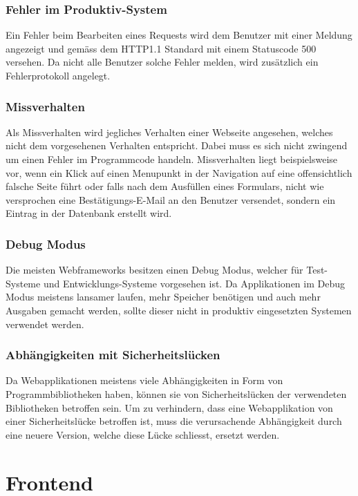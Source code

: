 \subsubsection{Fehler im Produktiv-System}
\label{ssub:fehlerimproduktivsystem}
Ein Fehler beim Bearbeiten eines Requests wird dem Benutzer mit einer Meldung angezeigt und gemäss dem HTTP1.1\cite{rfc2616} Standard mit einem Statuscode 500 versehen. Da nicht alle Benutzer solche Fehler melden, wird zusätzlich ein Fehlerprotokoll angelegt.

\subsubsection{Missverhalten}
\label{ssub:missverhalten}
Als Missverhalten wird jegliches Verhalten einer Webseite angesehen, welches nicht dem vorgesehenen Verhalten entspricht. Dabei muss es sich nicht zwingend um einen Fehler im Programmcode handeln. Missverhalten liegt beispielsweise vor, wenn ein Klick auf einen Menupunkt in der Navigation auf eine offensichtlich falsche Seite führt oder falls nach dem Ausfüllen eines Formulars, nicht wie versprochen eine Bestätigungs-E-Mail an den Benutzer versendet, sondern ein Eintrag in der Datenbank erstellt wird.

\subsubsection{Debug Modus}
\label{ssub:debugmodus}
Die meisten Webframeworks besitzen einen Debug Modus, welcher für Test-Systeme und Entwicklungs-Systeme vorgesehen ist. Da Applikationen im Debug Modus meistens lansamer laufen, mehr Speicher benötigen und auch mehr Ausgaben gemacht werden, sollte dieser nicht in produktiv eingesetzten Systemen verwendet werden.

\subsubsection{Abhängigkeiten mit Sicherheitslücken}
\label{ssub:abhaengigkeitenmitsicherheitsluecken}
Da Webapplikationen meistens viele Abhängigkeiten in Form von Programmbibliotheken haben, können sie von Sicherheitslücken der verwendeten Bibliotheken betroffen sein. Um zu verhindern, dass eine Webapplikation von einer Sicherheitslücke betroffen ist, muss die verursachende Abhängigkeit durch eine neuere Version, welche diese Lücke schliesst, ersetzt werden.

\section{Frontend}
\label{sec:frontend}

